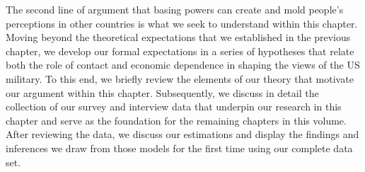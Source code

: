 The second line of argument that basing powers can create and mold people's perceptions in other countries is what we seek to understand within this chapter. Moving beyond the theoretical expectations that we established in the previous chapter, we develop our formal expectations in a series of hypotheses that relate both the role of contact and economic dependence in shaping the views of the US military. To this end, we briefly review the elements of our theory that motivate our argument within this chapter. Subsequently, we discuss in detail the collection of our survey and interview data that underpin our research in this chapter and serve as the foundation for the remaining chapters in this volume. After reviewing the data,  we discuss our estimations and display the findings and inferences we draw from those models for the first time using our complete data set.
